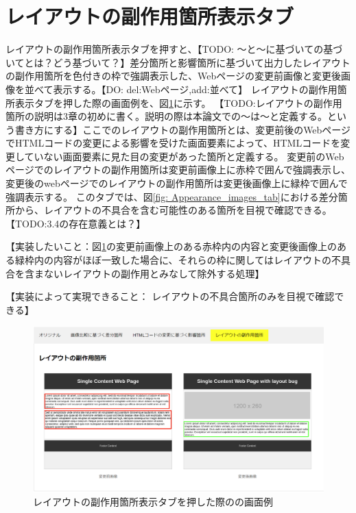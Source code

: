 \section{レイアウトの副作用箇所表示タブ}\label{sec:subeffect_tab}
レイアウトの副作用箇所表示タブを押すと、【TODO: ～と～に基づいての基づいてとは？どう基づいて？】差分箇所と影響箇所に基づいて出力したレイアウトの副作用箇所を色付きの枠で強調表示した、Webページの変更前画像と変更後画像を並べて表示する。【DO: del:Webページ,add:並べて】
レイアウトの副作用箇所表示タブを押した際の画面例を、図\ref{fig: Appearance_subEffect_tab}に示す。
【TODO:レイアウトの副作用箇所の説明は3章の初めに書く。説明の際は本論文での～は～と定義する。という書き方にする】ここでのレイアウトの副作用箇所とは、変更前後のWebページでHTMLコードの変更による影響を受けた画面要素によって、HTMLコードを変更していない画面要素に見た目の変更があった箇所と定義する。
変更前のWebページでのレイアウトの副作用箇所は変更前画像上に赤枠で囲んで強調表示し、変更後のwebページでのレイアウトの副作用箇所は変更後画像上に緑枠で囲んで強調表示する。
このタブでは、図\ref{fig: Appearance_images_tab}における差分箇所から、レイアウトの不具合を含む可能性のある箇所を目視で確認できる。
【TODO:3.4の存在意義とは？】
\par
【実装したいこと：図\ref{fig: Appearance_subEffect_tab}の変更前画像上のある赤枠内の内容と変更後画像上のある緑枠内の内容がほぼ一致した場合に、それらの枠に関してはレイアウトの不具合を含まないレイアウトの副作用とみなして除外する処理】
\par
【実装によって実現できること： レイアウトの不具合箇所のみを目視で確認できる】
\begin{figure}[tp]
    \begin{center}
        \includegraphics[width=1.0\columnwidth]{image/3_subEffect_tab.png}
        \caption{レイアウトの副作用箇所表示タブを押した際の\toolName の画面例}
        \label{fig: Appearance_subEffect_tab}
    \end{center}
\end{figure}

